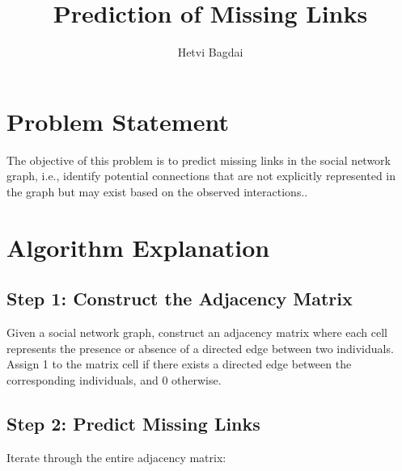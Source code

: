 \documentclass{article}
\title{Prediction of Missing Links}
\author{Hetvi Bagdai}
\begin{document}
\maketitle



\section{Problem Statement}
The objective of this problem is to predict missing links in the social network graph, i.e., identify potential connections that are not explicitly represented in the graph but may exist based on the observed interactions..



\section{Algorithm Explanation}

\subsection{Step 1: Construct the Adjacency Matrix}

Given a social network graph, construct an adjacency matrix where each cell represents the presence or absence of a directed edge between two individuals. Assign 1 to the matrix cell if there exists a directed edge between the corresponding individuals, and 0 otherwise.

\subsection{Step 2: Predict Missing Links}

Iterate through the entire adjacency matrix:
\end{document}
